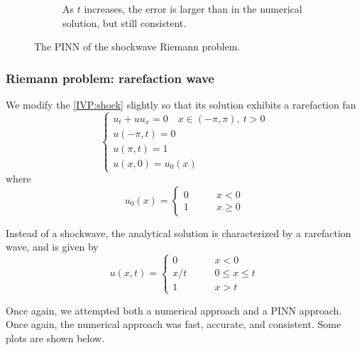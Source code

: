 \documentclass{myproject}
\begin{document}
\begin{figure}
\begin{subfigure}{.48\textwidth}
        \caption{As $t$ increases, the error is larger than in the numerical solution, but still consistent.}
    \end{subfigure}
    \caption{The PINN of the shockwave Riemann problem.}
\end{figure}

\subsubsection{Riemann problem: rarefaction wave}

We modify the \eqref{IVP:shock} slightly so that its solution exhibits a rarefaction fan
\begin{equation}\label{IVP:shock}
    \begin{cases}
        u_t + uu_x = 0 \quad x \in (-\pi,\pi), \: t > 0 \\
        u(-\pi,t) = 0 \\
        u(\pi,t) = 1 \\
        u(x,0) = u_0(x)
    \end{cases} 
\end{equation}
where 
\begin{equation}
    u_0(x) = \begin{cases}
        0 \qquad & x < 0 \\
        1 \qquad & x \geq 0
    \end{cases}
\end{equation}

Instead of a shockwave, the analytical solution is characterized by a rarefaction wave, and is given by
\begin{equation}
    u(x,t) = \begin{cases}
        0 \qquad & x < 0 \\
        x/t \qquad & 0 \leq x \leq t \\
        1 \qquad & x > t
    \end{cases}
\end{equation}

Once again, we attempted both a numerical approach and a PINN approach. Once again, the numerical approach was fast, accurate, and consistent. Some plots are shown below.
\end{document}
